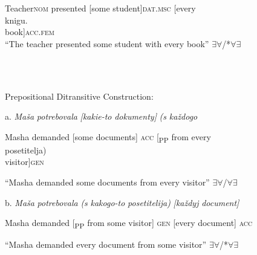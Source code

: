 \documentclass[output=paper,modfonts, nonflat]{langsci/langscibook}
\begin{document}
\begin{styleinnerExample}
  Teacher\textsc{nom} presented [some         student]\textsc{dat.msc}   [every \\
knigu.\\
book]\textsc{acc.fem}\\
“The teacher presented some student with every book” ${\exists}{\forall}$/*${\forall}{\exists}$
\end{styleinnerExample}

\ea%
    \label{ex:key:3}
    \gll\\
        \\
    \glt
    \z

         Prepositional Ditransitive Construction:

\begin{styleinnerExample}
a.  \textit{Maša}   \textit{potrebovala}  \textit{[kakie-to} \textit{dokumenty]}        \textit{(s}       \textit{každogo}  
\end{styleinnerExample}

\begin{styleinnerExample}
Masha demanded     [some documents] \textsc{acc} [\textsubscript{PP} from every \\
posetitelja)\\
visitor]\textsc{gen}
\end{styleinnerExample}

\begin{styleinnerExample}
  “Masha demanded some documents from every visitor”  ${\exists}{\forall}$/${\forall}{\exists}$
\end{styleinnerExample}

\begin{styleinnerExample}
b.  \textit{Maša}   \textit{potrebovala}   \textit{(s} \textit{kakogo-to} \textit{posetitelija)} \textit{[každyj} \textit{document]}
\end{styleinnerExample}

\begin{styleinnerExample}
  Masha demanded [\textsubscript{PP} from some   visitor] \textsc{gen} [every   document] \textsc{acc}
\end{styleinnerExample}

\begin{styleinnerExample}
  “Masha demanded every document from some visitor” ${\exists}{\forall}$/*${\forall}{\exists}$
\end{styleinnerExample}

\ea%
    \label{ex:key:4}
    \gll\\
        \\
    \glt
    \z
\end{document}

